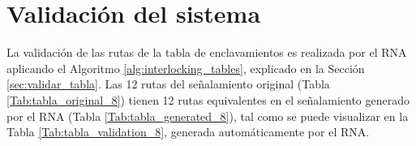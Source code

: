 \section{Validación del sistema}

    La validación de las rutas de la tabla de enclavamientos es realizada por el RNA aplicando el Algoritmo \ref{alg:interlocking_tables}, explicado en la Sección \ref{sec:validar_tabla}. Las 12 rutas del señalamiento original (Tabla \ref{Tab:tabla_original_8}) tienen 12 rutas equivalentes en el señalamiento generado por el RNA (Tabla \ref{Tab:tabla_generated_8}), tal como se puede visualizar en la Tabla \ref{Tab:tabla_validation_8}, generada automáticamente por el RNA.

    \begin{table}[H]
        {
        \caption{Equivalencias entre las rutas originales y las generadas por el RNA.}
        \label{Tab:tabla_validation_8}
        \centering
            \begin{center}
            \end{center}
        }    
    \end{table}
    
